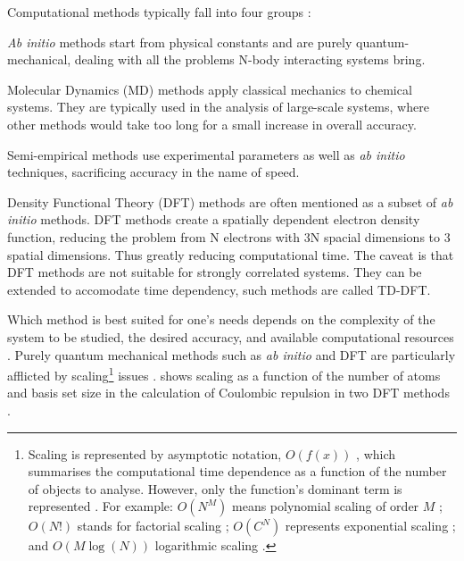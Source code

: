 Computational methods typically fall into four groups \cite{md1,gromacs}:
\begin{inparaenum} [1)\upshape]
	\item \emph{Ab initio} methods start from physical constants and are purely quantum-mechanical, dealing with all the problems N-body interacting systems bring.
	\item Molecular Dynamics (MD) methods apply classical mechanics to chemical systems. They are typically used in the analysis of large-scale systems, where other methods would take too long 	for a small increase in overall accuracy.
	\item Semi-empirical methods use experimental parameters as well as \textit{ab initio} techniques, sacrificing accuracy in the name of speed.
	\item Density Functional Theory (DFT) methods are often mentioned as a subset of \emph{ab initio} methods. DFT methods create a spatially dependent electron density function, reducing the 	problem from N electrons with 3N spacial dimensions to 3 spatial dimensions. Thus greatly reducing computational time. The caveat is that DFT methods are not suitable for strongly correlated 	systems. They can be extended to accomodate time dependency, such methods are called TD-DFT.
\end{inparaenum}

Which method is best suited for one's needs depends on the complexity of the system to be studied, the desired accuracy, and available computational resources \cite{molcas2}. Purely quantum mechanical methods such as \emph{ab initio} and DFT are particularly afflicted by scaling\footnote{\label{fn:1}Scaling is represented by asymptotic notation, $O(f(x))$ \cite{perturbation}, which summarises the computational time dependence as a function of the number of objects to analyse. However, only the function's dominant term is represented \cite{bigo}. For example: $ O(N^{M}) $ means polynomial scaling of order $ M $ \cite{poly_scale}; $O(N!) $ stands for factorial scaling \cite{fact_scale}; $O(C^{N})$ represents exponential scaling \cite{exp_scale}; and $O(M\log(N)) $ logarithmic scaling \cite{log_scale}.} issues \cite{scale}.  shows scaling as a function of the number of atoms and basis set size in the calculation of Coulombic repulsion in two DFT methods \cite{qchem}.

